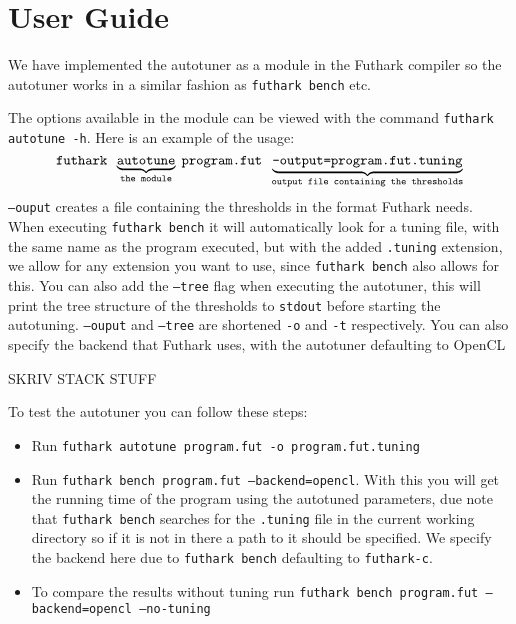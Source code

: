 \section{User Guide}
We have implemented the autotuner as a module in the Futhark compiler
so the autotuner works in a similar fashion as \texttt{futhark bench} etc.

The options available in the module can be viewed with the command 
\texttt{futhark autotune -h}. Here is an example of the usage:
$$\text{\texttt{futhark }}\underbrace{\texttt{autotune}}_\text{\texttt{the module}}\;
\text{\texttt{program.fut }} \underbrace{\texttt{--output=program.fut.tuning}}_\text{\texttt{output file containing the thresholds}}$$
\texttt{--ouput} creates a file containing the thresholds in the format Futhark needs. When executing \texttt{futhark bench} it will automatically look for a tuning file, with the same name as the program executed, but with the added \texttt{.tuning} extension, we allow for any extension you want to use, since \texttt{futhark bench} also allows for this. You can also add the \texttt{--tree} flag when executing the autotuner, this will print the tree structure of the thresholds to \texttt{stdout} before starting the autotuning.  \texttt{--ouput} and \texttt{--tree} are shortened \texttt{-o} and \texttt{-t} respectively. You can also specify the backend that Futhark uses, with the autotuner defaulting to OpenCL

SKRIV STACK STUFF

To test the autotuner you can follow these steps:
\begin{itemize}
\item Run \texttt{futhark autotune program.fut -o program.fut.tuning}
\item Run \texttt{futhark bench program.fut --backend=opencl}. With this you will get the 
running time of the program using the autotuned parameters, due note that \texttt{futhark bench} searches for the \texttt{.tuning} file in the current working directory so if it is not in there a path to it should be specified. We specify the backend here due to \texttt{futhark bench} defaulting to \texttt{futhark-c}.
\item To compare the results without tuning run \texttt{futhark bench program.fut --backend=opencl --no-tuning}
\end{itemize}